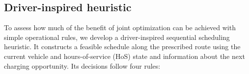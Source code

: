 \documentclass[3p,11pt,authoryear]{elsarticle}  %
\begin{document}

\subsection{Driver-inspired heuristic}
\label{sec:driver_heuristic}

To assess how much of the benefit of joint optimization can be achieved with
simple operational rules, we develop a driver-inspired sequential scheduling
heuristic. It constructs a feasible schedule along the prescribed route using
the current vehicle and hours-of-service (HoS) state and information about
the next charging opportunity. Its decisions follow four rules:
\end{document}
